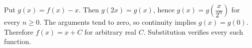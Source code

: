 Put $g(x)=f(x)-x$. Then $g(2x)=g(x)$, hence $g(x)=g(\dfrac{x}{2^n})$ for every $n\ge0$. The arguments tend to zero, so continuity implies $g(x)=g(0)$. Therefore $\boxed{f(x)=x+C}$ for arbitrary real $C$. Substitution verifies every such function.
